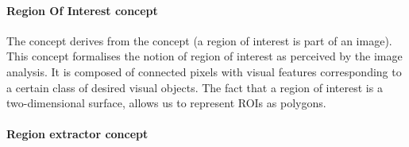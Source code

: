 \paragraph{Region Of Interest concept} %
\label{par:region_concept}

The concept  derives from the concept  (a region of interest is part of an image).
This concept formalises the notion of region of interest as perceived by the image analysis.
It is composed of connected pixels with visual features corresponding to a certain class of desired visual objects.
The fact that a region of interest is a two-dimensional surface, allows us to represent ROIs as polygons.





\paragraph{Region extractor concept} %
\label{par:region_extractor_concept}

